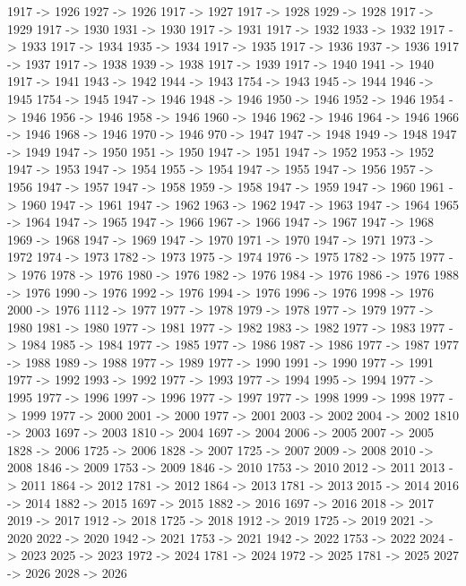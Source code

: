 {	1917 -> 1926
	1927 -> 1926
	1917 -> 1927
	1917 -> 1928
	1929 -> 1928
	1917 -> 1929
	1917 -> 1930
	1931 -> 1930
	1917 -> 1931
	1917 -> 1932
	1933 -> 1932
	1917 -> 1933
	1917 -> 1934
	1935 -> 1934
	1917 -> 1935
	1917 -> 1936
	1937 -> 1936
	1917 -> 1937
	1917 -> 1938
	1939 -> 1938
	1917 -> 1939
	1917 -> 1940
	1941 -> 1940
	1917 -> 1941
	1943 -> 1942
	1944 -> 1943
	1754 -> 1943
	1945 -> 1944
	1946 -> 1945
	1754 -> 1945
	1947 -> 1946
	1948 -> 1946
	1950 -> 1946
	1952 -> 1946
	1954 -> 1946
	1956 -> 1946
	1958 -> 1946
	1960 -> 1946
	1962 -> 1946
	1964 -> 1946
	1966 -> 1946
	1968 -> 1946
	1970 -> 1946
	970 -> 1947
	1947 -> 1948
	1949 -> 1948
	1947 -> 1949
	1947 -> 1950
	1951 -> 1950
	1947 -> 1951
	1947 -> 1952
	1953 -> 1952
	1947 -> 1953
	1947 -> 1954
	1955 -> 1954
	1947 -> 1955
	1947 -> 1956
	1957 -> 1956
	1947 -> 1957
	1947 -> 1958
	1959 -> 1958
	1947 -> 1959
	1947 -> 1960
	1961 -> 1960
	1947 -> 1961
	1947 -> 1962
	1963 -> 1962
	1947 -> 1963
	1947 -> 1964
	1965 -> 1964
	1947 -> 1965
	1947 -> 1966
	1967 -> 1966
	1947 -> 1967
	1947 -> 1968
	1969 -> 1968
	1947 -> 1969
	1947 -> 1970
	1971 -> 1970
	1947 -> 1971
	1973 -> 1972
	1974 -> 1973
	1782 -> 1973
	1975 -> 1974
	1976 -> 1975
	1782 -> 1975
	1977 -> 1976
	1978 -> 1976
	1980 -> 1976
	1982 -> 1976
	1984 -> 1976
	1986 -> 1976
	1988 -> 1976
	1990 -> 1976
	1992 -> 1976
	1994 -> 1976
	1996 -> 1976
	1998 -> 1976
	2000 -> 1976
	1112 -> 1977
	1977 -> 1978
	1979 -> 1978
	1977 -> 1979
	1977 -> 1980
	1981 -> 1980
	1977 -> 1981
	1977 -> 1982
	1983 -> 1982
	1977 -> 1983
	1977 -> 1984
	1985 -> 1984
	1977 -> 1985
	1977 -> 1986
	1987 -> 1986
	1977 -> 1987
	1977 -> 1988
	1989 -> 1988
	1977 -> 1989
	1977 -> 1990
	1991 -> 1990
	1977 -> 1991
	1977 -> 1992
	1993 -> 1992
	1977 -> 1993
	1977 -> 1994
	1995 -> 1994
	1977 -> 1995
	1977 -> 1996
	1997 -> 1996
	1977 -> 1997
	1977 -> 1998
	1999 -> 1998
	1977 -> 1999
	1977 -> 2000
	2001 -> 2000
	1977 -> 2001
	2003 -> 2002
	2004 -> 2002
	1810 -> 2003
	1697 -> 2003
	1810 -> 2004
	1697 -> 2004
	2006 -> 2005
	2007 -> 2005
	1828 -> 2006
	1725 -> 2006
	1828 -> 2007
	1725 -> 2007
	2009 -> 2008
	2010 -> 2008
	1846 -> 2009
	1753 -> 2009
	1846 -> 2010
	1753 -> 2010
	2012 -> 2011
	2013 -> 2011
	1864 -> 2012
	1781 -> 2012
	1864 -> 2013
	1781 -> 2013
	2015 -> 2014
	2016 -> 2014
	1882 -> 2015
	1697 -> 2015
	1882 -> 2016
	1697 -> 2016
	2018 -> 2017
	2019 -> 2017
	1912 -> 2018
	1725 -> 2018
	1912 -> 2019
	1725 -> 2019
	2021 -> 2020
	2022 -> 2020
	1942 -> 2021
	1753 -> 2021
	1942 -> 2022
	1753 -> 2022
	2024 -> 2023
	2025 -> 2023
	1972 -> 2024
	1781 -> 2024
	1972 -> 2025
	1781 -> 2025
	2027 -> 2026
	2028 -> 2026
}
